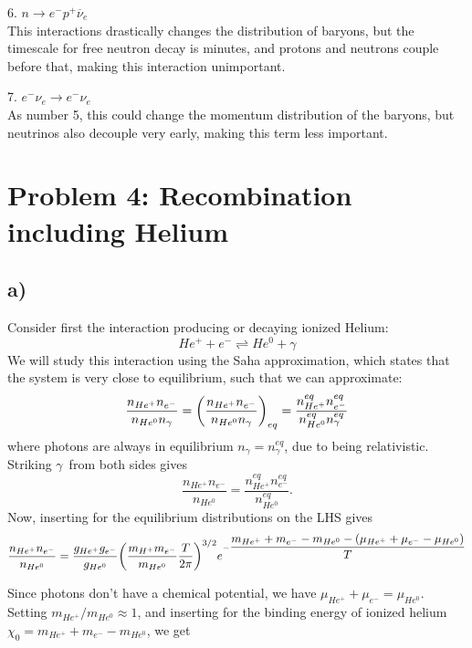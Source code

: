 \documentclass[10pt, a4paper]{article}
\renewcommand{\exp}{e^}
\renewcommand{\exp}{e^}
\renewcommand{\bar}{\overline}
\begin{document}
6. $n \rightarrow e^{-} p^{+} \bar{\nu}_{e}$\\
This interactions drastically changes the distribution of baryons, but the timescale for free neutron decay is minutes, and protons and neutrons couple before that, making this interaction unimportant.


7. $e^{-} \nu_{e} \rightarrow e^{-} \nu_{e}$\\
As number 5, this could change the momentum distribution of the baryons, but neutrinos also decouple very early, making this term less important.


\section*{Problem 4: Recombination including Helium}
\subsection*{a)}
Consider first the interaction producing or decaying ionized Helium:
\begin{equation}
    He^+ + e^- \rightleftharpoons He^0 + \gamma
\end{equation}
We will study this interaction using the Saha approximation, which states that the system is very close to equilibrium, such that we can approximate:
\begin{equation}
    \frac{n_{He^+}n_{e^-}}{n_{He^0}n_\gamma} = \qty(\frac{n_{He^+}n_{e^-}}{n_{He^0}n_\gamma})_{eq} = \frac{n_{He^+}^{eq} n_{e^-}^{eq}}{n_{He^0}^{eq}n_{\gamma}^{eq}}
\end{equation}
where photons are always in equilibrium $n_\gamma = n_\gamma^{eq}$, due to being relativistic. Striking $\gamma$ from both sides gives
\begin{equation}
    \frac{n_{He^+}n_{e^-}}{n_{He^0}} = \frac{n_{He^+}^{eq} n_{e^-}^{eq}}{n_{He^0}^{eq}}.
\end{equation}
Now, inserting for the equilibrium distributions on the LHS gives
\begin{equation}
    \frac{n_{He^+}n_{e^-}}{n_{He^0}} = \frac{g_{He^+}g_{e^-}}{g_{He^0}} \qty(\frac{m_{H^+}m_{e^-}}{m_{He^0}}\frac{T}{2\pi})^{3/2} \exp{- \dfrac{m_{He^+} + m_{e^-} - m_{He^0} - (\mu_{He^+} + \mu_{e^-} - \mu_{He^0})}{T}}
\end{equation}

Since photons don't have a chemical potential, we have $\mu_{He^+} + \mu_{e^-} = \mu_{He^0}$. Setting $m_{He^+}/m_{He^0} \approx 1$, and inserting for the binding energy of ionized helium $\chi_0 = m_{He^+} + m_{e^-} - m_{He^0}$, we get
\end{document}
